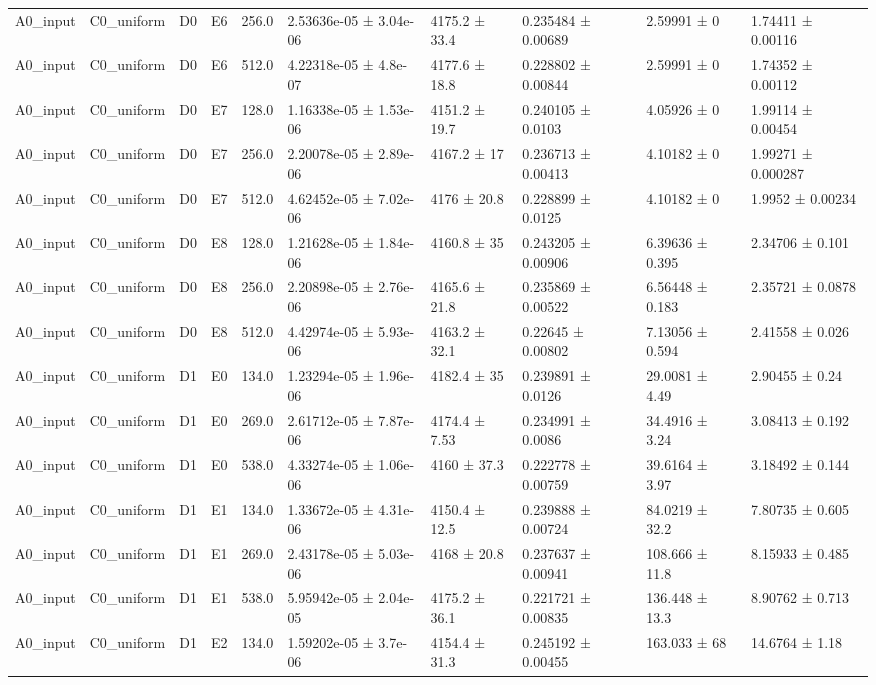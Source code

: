 \begin{table}
\begin{tabular}{llllllllll}
A0\_input & C0\_uniform & D0 & E6 & 256.0 & 2.53636e-05 ± 3.04e-06 & 4175.2 ± 33.4 & 0.235484 ± 0.00689 & 2.59991 ± 0 & 1.74411 ± 0.00116 \\
A0\_input & C0\_uniform & D0 & E6 & 512.0 & 4.22318e-05 ± 4.8e-07 & 4177.6 ± 18.8 & 0.228802 ± 0.00844 & 2.59991 ± 0 & 1.74352 ± 0.00112 \\
A0\_input & C0\_uniform & D0 & E7 & 128.0 & 1.16338e-05 ± 1.53e-06 & 4151.2 ± 19.7 & 0.240105 ± 0.0103 & 4.05926 ± 0 & 1.99114 ± 0.00454 \\
A0\_input & C0\_uniform & D0 & E7 & 256.0 & 2.20078e-05 ± 2.89e-06 & 4167.2 ± 17 & 0.236713 ± 0.00413 & 4.10182 ± 0 & 1.99271 ± 0.000287 \\
A0\_input & C0\_uniform & D0 & E7 & 512.0 & 4.62452e-05 ± 7.02e-06 & 4176 ± 20.8 & 0.228899 ± 0.0125 & 4.10182 ± 0 & 1.9952 ± 0.00234 \\
A0\_input & C0\_uniform & D0 & E8 & 128.0 & 1.21628e-05 ± 1.84e-06 & 4160.8 ± 35 & 0.243205 ± 0.00906 & 6.39636 ± 0.395 & 2.34706 ± 0.101 \\
A0\_input & C0\_uniform & D0 & E8 & 256.0 & 2.20898e-05 ± 2.76e-06 & 4165.6 ± 21.8 & 0.235869 ± 0.00522 & 6.56448 ± 0.183 & 2.35721 ± 0.0878 \\
A0\_input & C0\_uniform & D0 & E8 & 512.0 & 4.42974e-05 ± 5.93e-06 & 4163.2 ± 32.1 & 0.22645 ± 0.00802 & 7.13056 ± 0.594 & 2.41558 ± 0.026 \\
A0\_input & C0\_uniform & D1 & E0 & 134.0 & 1.23294e-05 ± 1.96e-06 & 4182.4 ± 35 & 0.239891 ± 0.0126 & 29.0081 ± 4.49 & 2.90455 ± 0.24 \\
A0\_input & C0\_uniform & D1 & E0 & 269.0 & 2.61712e-05 ± 7.87e-06 & 4174.4 ± 7.53 & 0.234991 ± 0.0086 & 34.4916 ± 3.24 & 3.08413 ± 0.192 \\
A0\_input & C0\_uniform & D1 & E0 & 538.0 & 4.33274e-05 ± 1.06e-06 & 4160 ± 37.3 & 0.222778 ± 0.00759 & 39.6164 ± 3.97 & 3.18492 ± 0.144 \\
A0\_input & C0\_uniform & D1 & E1 & 134.0 & 1.33672e-05 ± 4.31e-06 & 4150.4 ± 12.5 & 0.239888 ± 0.00724 & 84.0219 ± 32.2 & 7.80735 ± 0.605 \\
A0\_input & C0\_uniform & D1 & E1 & 269.0 & 2.43178e-05 ± 5.03e-06 & 4168 ± 20.8 & 0.237637 ± 0.00941 & 108.666 ± 11.8 & 8.15933 ± 0.485 \\
A0\_input & C0\_uniform & D1 & E1 & 538.0 & 5.95942e-05 ± 2.04e-05 & 4175.2 ± 36.1 & 0.221721 ± 0.00835 & 136.448 ± 13.3 & 8.90762 ± 0.713 \\
A0\_input & C0\_uniform & D1 & E2 & 134.0 & 1.59202e-05 ± 3.7e-06 & 4154.4 ± 31.3 & 0.245192 ± 0.00455 & 163.033 ± 68 & 14.6764 ± 1.18 \\

\end{tabular}
\end{table}
